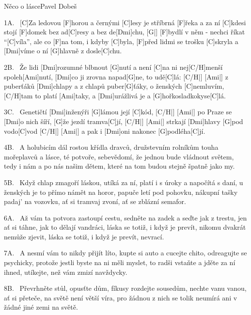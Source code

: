 \begin{song}{Něco o lásce}{Pavel Dobeš}

\begin{xverse}{1A.~}
[C]Za ledovou [F]horou a černými [C]lesy
je stříbrná [F]{ře}ka a za ní [C]kdesi
stojí [F]domek bez ad[C]resy a bez de[Dmi]chu, [G|]{}
[F]bydlí v něm - nechci říkat ``[C]víla'',
ale co [F]na tom, i kdyby [C]byla,
[F]před lidmi se trošku [C]skryla
a [Dmi]víme o ní [G]hlavně z dosle[C]chu.
\end{xverse}

\begin{xverse}{2B.~}
Že lidi [Dmi]rozumné blbnout [G]nutí
a není [C]na ni nej[C/H]menší spoleh[Ami]nutí,
[Dmi]co ji zrovna napad[G]ne, to udě[C]lá:  [C/H|]{} [Ami|]{}
z puberťáků [Dmi]chlapy a z chlapů puber[G]{ťá}ky,
o ženských [C]nemluvím, [C/H]tam to platí [Ami]taky,
a [Dmi]urážlivá je a [G]hořkosladkokyse[C]lá.
\end{xverse}

\begin{xverse}{3C.~}
Genetičtí [Dmi]inženýři [G]lámou její [C]kód, [C/H|]{} [Ami|]{}
po Praze se [Dmi]o nich šíří, [G]{že} jezdí tramva[C]jí, [C/H|]{} [Ami|]{}
strkají [Dmi]hlavy [G]pod vodo[C]vod  [C/H|]{} [Ami|]{}
a pak i [Dmi]oni nakonec [G]podléha[C]jí.
\end{xverse}

\begin{xverse}{4B.~}
A holubicím dál rostou křídla dravců,
družstevním rolníkům touha mořeplavců
a lásce, té potvoře, sebevědomí,
že jednou bude vládnout světem,
tedy i nám a po nás našim dětem,
které na tom budou stejně špatně jako my.
\end{xverse}

\begin{xverse}{5B.~}
Když chlap zmagoří láskou, utíká za ní,
platí i s úroky a napočítá s daní,
u ženských je to přímo námět na horor,
papuče letí pod pohovku,
nákupní tašky padaj' na vozovku,
ať si tramvaj zvoní, ať se zblázní semafor.
\end{xverse}

\begin{xverse}{6A.~}
Až vám ta potvora zastoupí cestu,
sedněte na zadek a seďte jak z trestu,
jen ať si táhne, jak to dělají vandráci,
láska se totiž, i když je prevít,
nikomu dvakrát nemůže zjevit,
láska se totiž, i když je prevít, nevrací.
\end{xverse}

\begin{xverse}{7A.~}
A nesmí vám to nikdy přijít líto,
kupte si auto a cucejte chito,
odreagujte se psychicky,
protože jestli byste na ni měli myslet,
to radši vstaňte a jděte za ní ihned,
utíkejte, než vám zmizí navždycky.
\end{xverse}

\begin{xverse}{8B.~}
Převrhněte stůl, opusťte dům,
fíkusy rozdejte sousedům,
nechte vanu vanou, ať si přeteče,
na světě není větší víra,
pro žádnou z nich se tolik neumírá
ani v žádné jiné zemi na světě.
\end{xverse}

\end{song}


